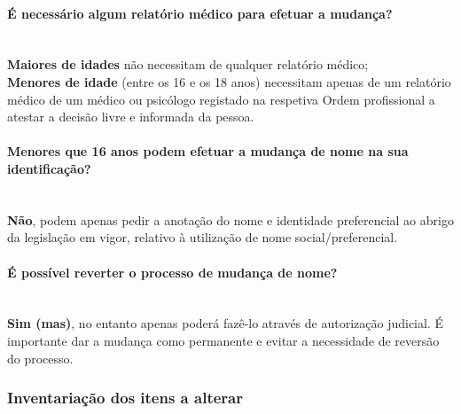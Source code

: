 \paragraph{É necessário algum relatório médico para efetuar a mudança?}
\leavevmode\\
\textbf{Maiores de idades} não necessitam de qualquer relatório médico; \\
\textbf{Menores de idade} (entre os 16 e os 18 anos) necessitam apenas
de um relatório médico de um médico ou psicólogo registado na respetiva
Ordem profissional a atestar a decisão livre e informada da pessoa. \\

\paragraph{Menores que 16 anos podem efetuar a mudança de nome na sua identificação?}
\leavevmode\\
\textbf{Não}, podem apenas pedir a anotação do nome e identidade
preferencial ao abrigo da legislação em vigor, relativo à utilização de
nome social/preferencial. \\

\paragraph{É possível reverter o processo de mudança de nome?}
\leavevmode\\
\textbf{Sim (mas)}, no entanto apenas poderá fazê-lo através de
autorização judicial. É importante dar a mudança como permanente e
evitar a necessidade de reversão do processo. \\

\subsubsection{Inventariação dos itens a alterar}

